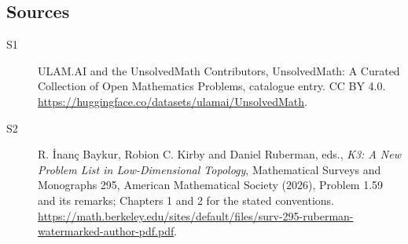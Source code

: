 \documentclass[11pt]{article}
\begin{document}
\subsection{Sources}
\begin{description}
\item[\hypertarget{source:statement:1}{S1}] ULAM.AI and the UnsolvedMath Contributors, UnsolvedMath: A Curated Collection of Open Mathematics Problems, catalogue entry. CC BY 4.0. \url{https://huggingface.co/datasets/ulamai/UnsolvedMath}.
\item[\hypertarget{source:statement:2}{S2}] R. İnanç Baykur, Robion C. Kirby and Daniel Ruberman, eds., \emph{K3: A New Problem List in Low-Dimensional Topology}, Mathematical Surveys and Monographs 295, American Mathematical Society (2026), Problem 1.59 and its remarks; Chapters 1 and 2 for the stated conventions. \url{https://math.berkeley.edu/sites/default/files/surv-295-ruberman-watermarked-author-pdf.pdf}.
\end{description}
\label{end:statement}
\end{document}
